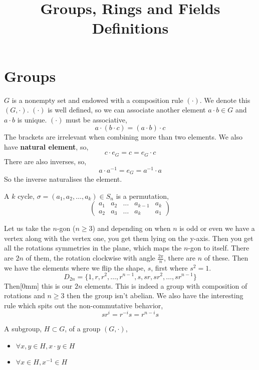 \documentclass{article}
\title{Groups, Rings and Fields Definitions}
\begin{document}
\maketitle

\section{Groups}

\begin{ndefi}[Group]
  $G$ is a nonempty set and endowed with a composition rule $(\cdot)$. We denote this $(G, \cdot)$. $(\cdot)$ is well defined, so we can associate another element $a \cdot b \in G$ and $a \cdot b$ is unique. $(\cdot)$ must be associative,
  $$ a \cdot (b \cdot c) = (a \cdot b) \cdot c $$
  The brackets are irrelevant when combining more than two elements. We also have \textbf{natural element}, so,
  $$ c \cdot e_G = c = e_G \cdot c $$
  There are also inverses, so,
  $$ a \cdot a^{-1} = e_G = a^{-1} \cdot a $$
  So the inverse naturalises the element.
\end{ndefi}

\begin{ndefi}[k-cycle]
  A $k$ cycle, $\sigma = (a_1, a_2, \dots, a_k) \in S_n$  is a permutation,
  $$ \begin{pmatrix}
    a_1 & a_2 & \dots & a_{k-1} & a_k \\
    a_2 & a_3 & \dots & a_k & a_1
  \end{pmatrix} $$
\end{ndefi}

\begin{ndefi}
  Let us take the $n$-gon ($n \ge 3$) and depending on when $n$ is odd or even we have a vertex along with the vertex one, you get them lying on the y-axis. Then you get all the rotations symmetries in the plane, which maps the $n$-gon to itself. There are $2n$ of them, the rotation clockwise with angle $\frac{2\pi}{n}$, there are $n$ of these. Then we have the elements where we flip the shape, $s$, first where $s^2 = 1$.
  $$ D_{2n} = \{1, r, r^2, \dots, r^{n-1}, s, sr, sr^2, \dots, sr^{n-1} \} $$
  Then[0mm] this is our $2n$ elements. This is indeed a group with composition of rotations and $n \ge 3$ then the group isn't abelian. We also have the interesting rule which spits out the non-commutative behavior,
  $$ sr^i = r^{-i}s = r^{n-i}s $$
\end{ndefi}

\begin{ndefi}[Subgroup]
  A subgroup, $H \subset G$, of a group $(G, \cdot)$,
  \begin{itemize}
    \item $\forall x, y \in H, x \cdot y \in H$
    \item $\forall x \in H, x^{-1} \in H$
  \end{itemize}
\end{ndefi}
\end{document}
